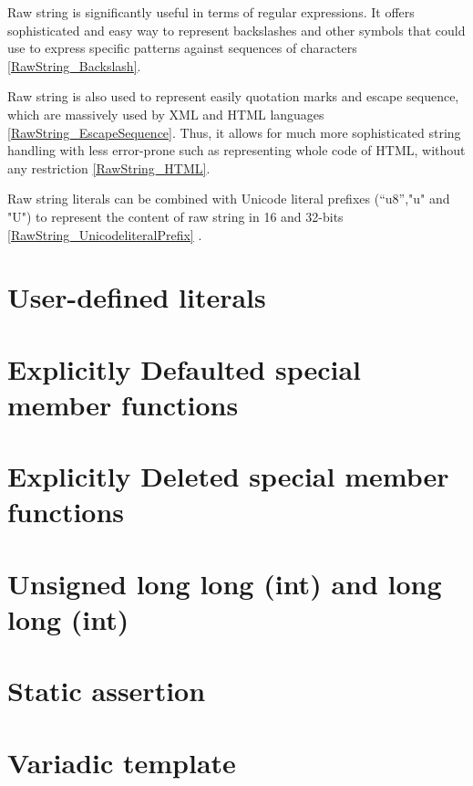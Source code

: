 \documentclass[11pt]{report}
\begin{document}
Raw string is significantly useful in terms of regular expressions. It offers sophisticated and easy way to represent backslashes and other symbols that could use to express specific patterns against sequences of characters \ref{RawString_Backslash}.
\newline

Raw string is also used to represent easily quotation marks and escape sequence, which are massively used by XML and HTML languages \ref{RawString_EscapeSequence}. Thus, it allows for much more sophisticated string handling with less error-prone such as representing whole code of HTML, without any restriction \ref{RawString_HTML}.
\newline

Raw string literals can be combined with Unicode literal prefixes  (“u8”,"u" and "U") to represent the content of raw string in 16 and 32-bits \ref{RawString_UnicodeliteralPrefix} \cite{Gregorie:professionalcpp}.

\section{User-defined literals}
\label{section: User-defined literals}

\section{Explicitly Defaulted special member functions}
\label{section: Defaulted special member functions}

\section{Explicitly Deleted special member functions}
\label{section: Deleted special member functions}

\section{Unsigned long long (int) and long long (int)}
\label{section: Unsigned and long long (int)}

\section{Static assertion}
\label{section: Static assertion}

\section{Variadic template}
\label{section: Variadic template}
\end{document}
